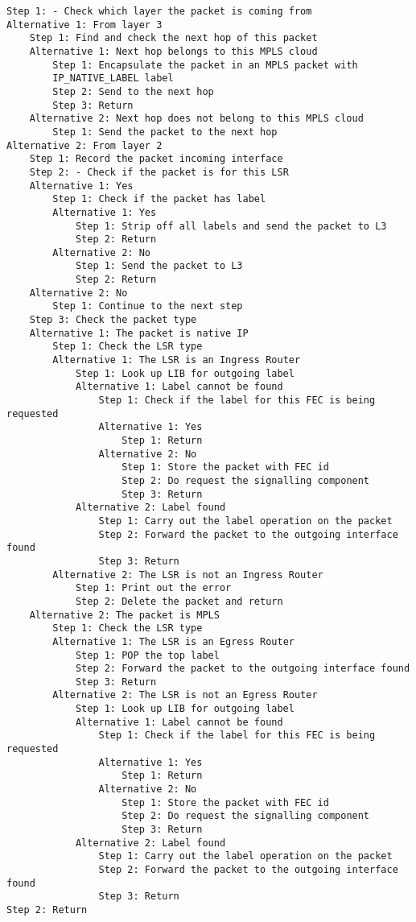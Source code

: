 \begin{verbatim}
Step 1: - Check which layer the packet is coming from
Alternative 1: From layer 3
    Step 1: Find and check the next hop of this packet
    Alternative 1: Next hop belongs to this MPLS cloud
        Step 1: Encapsulate the packet in an MPLS packet with
        IP_NATIVE_LABEL label
        Step 2: Send to the next hop
        Step 3: Return
    Alternative 2: Next hop does not belong to this MPLS cloud
        Step 1: Send the packet to the next hop
Alternative 2: From layer 2
    Step 1: Record the packet incoming interface
    Step 2: - Check if the packet is for this LSR
    Alternative 1: Yes
        Step 1: Check if the packet has label
        Alternative 1: Yes
            Step 1: Strip off all labels and send the packet to L3
            Step 2: Return
        Alternative 2: No
            Step 1: Send the packet to L3
            Step 2: Return
    Alternative 2: No
        Step 1: Continue to the next step
    Step 3: Check the packet type
    Alternative 1: The packet is native IP
        Step 1: Check the LSR type
        Alternative 1: The LSR is an Ingress Router
            Step 1: Look up LIB for outgoing label
            Alternative 1: Label cannot be found
                Step 1: Check if the label for this FEC is being requested
                Alternative 1: Yes
                    Step 1: Return
                Alternative 2: No
                    Step 1: Store the packet with FEC id
                    Step 2: Do request the signalling component
                    Step 3: Return
            Alternative 2: Label found
                Step 1: Carry out the label operation on the packet
                Step 2: Forward the packet to the outgoing interface found
                Step 3: Return
        Alternative 2: The LSR is not an Ingress Router
            Step 1: Print out the error
            Step 2: Delete the packet and return
    Alternative 2: The packet is MPLS
        Step 1: Check the LSR type
        Alternative 1: The LSR is an Egress Router
            Step 1: POP the top label
            Step 2: Forward the packet to the outgoing interface found
            Step 3: Return
        Alternative 2: The LSR is not an Egress Router
            Step 1: Look up LIB for outgoing label
            Alternative 1: Label cannot be found
                Step 1: Check if the label for this FEC is being requested
                Alternative 1: Yes
                    Step 1: Return
                Alternative 2: No
                    Step 1: Store the packet with FEC id
                    Step 2: Do request the signalling component
                    Step 3: Return
            Alternative 2: Label found
                Step 1: Carry out the label operation on the packet
                Step 2: Forward the packet to the outgoing interface found
                Step 3: Return
Step 2: Return
\end{verbatim}


